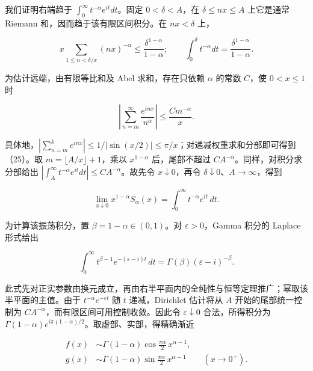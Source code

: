 \documentclass[11pt,a4paper]{article}
\begin{document}
我们证明右端趋于 \(\int_0^\infty t^{-\alpha}e^{it}dt\)。固定
\(0<\delta<A\)，在 \(\delta\le nx\le A\) 上它是通常 Riemann
和，因而趋于该有限区间积分。在 \(nx<\delta\) 上，

\begin{equation}
x\sum_{1\le n<\delta/x}(nx)^{-\alpha}
\le\frac{\delta^{1-\alpha}}{1-\alpha};
\qquad
\int_0^\delta t^{-\alpha}dt=\frac{\delta^{1-\alpha}}{1-\alpha}.
\tag{24}
\end{equation}

为估计远端，由有限等比和及 Abel 求和，存在只依赖 \(\alpha\) 的常数
\(C\)，使 \(0<x\le1\) 时

\begin{equation}
\left|\sum_{n=m}^{\infty}\frac{e^{inx}}{n^\alpha}\right|
\le\frac{C m^{-\alpha}}{x}.
\tag{25}
\end{equation}

具体地，\(|\sum_{n=m}^ke^{inx}|\le1/|\sin(x/2)|\le\pi/x\)；对递减权重求和分部即可得到（25）。取
\(m=\lfloor A/x\rfloor+1\)，乘以 \(x^{1-\alpha}\) 后，尾部不超过
\(CA^{-\alpha}\)。同样，对积分求分部给出
\(|\int_A^\infty t^{-\alpha}e^{it}dt|\le CA^{-\alpha}\)。故先令
\(x\downarrow0\)，再令 \(\delta\downarrow0\)、\(A\to\infty\)，得到

\begin{equation}
\lim_{x\downarrow0}x^{1-\alpha}S_\alpha(x)
=\int_0^\infty t^{-\alpha}e^{it}\,dt.
\tag{26}
\end{equation}

为计算该振荡积分，置 \(\beta=1-\alpha\in(0,1)\)。对
\(\varepsilon>0\)，Gamma 积分的 Laplace 形式给出

\begin{equation}
\int_0^\infty t^{\beta-1}e^{-(\varepsilon-i)t}\,dt
=\Gamma(\beta)(\varepsilon-i)^{-\beta}.
\tag{27}
\end{equation}

此式先对正实参数由换元成立，再由右半平面内的全纯性与恒等定理推广；幂取该半平面的主值。由于
\(t^{-\alpha}e^{-\varepsilon t}\) 随 \(t\) 递减，Dirichlet 估计将从
\(A\) 开始的尾部统一控制为
\(CA^{-\alpha}\)，而有限区间可用控制收敛。因此令
\(\varepsilon\downarrow0\) 合法，所得积分为
\(\Gamma(1-\alpha)e^{i\pi(1-\alpha)/2}\)。取虚部、实部，得精确渐近

\begin{equation}
\begin{aligned}
f(x)&\sim\Gamma(1-\alpha)\cos\frac{\pi\alpha}{2}\,x^{\alpha-1},\\
g(x)&\sim\Gamma(1-\alpha)\sin\frac{\pi\alpha}{2}\,x^{\alpha-1}
\qquad(x\to0^+).
\end{aligned}\tag{28}
\end{equation}
\end{document}
